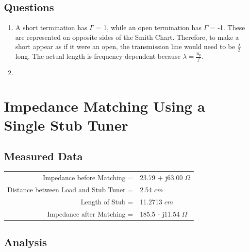 \documentclass{article}
\begin{document}
\subsection{Questions}

\begin{enumerate}
	\item A short termination has $\Gamma$ = 1, while an open termination has $\Gamma$ = -1. These are represented on opposite sides of the Smith Chart. Therefore, to make a short appear as if it were an open, the transmission line would need to be $\frac{\lambda}{2}$ long. The actual length is frequency dependent because $\lambda = \frac{u_p}{f}$.
	\item
\end{enumerate}


\section{Impedance Matching Using a Single Stub Tuner}

\subsection{Measured Data}

\begin{table}[H]
\centering
	\begin{tabular}{rl}
	Impedance before Matching =   			 & 23.79 + j63.00 $\Omega$  \\
	Distance between Load and Stub Tuner =   & 2.54 $cm$  \\
	Length of Stub =   						 & 11.2713 $cm$  \\
	Impedance after Matching =  			 & 185.5 - j11.54 $\Omega$
	\end{tabular}
\end{table}

\subsection{Analysis}
\end{document}
